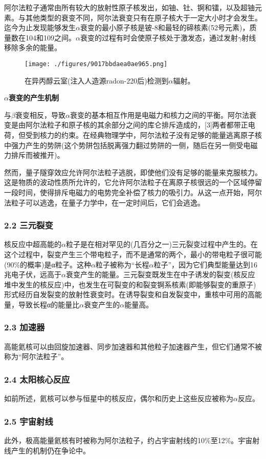 阿尔法粒子通常由所有较大的放射性原子核发出，如铀、钍、锕和镭，以及超铀元素。与其他类型的衰变不同，阿尔法衰变只有在原子核大于一定大小时才会发生。迄今为止发现能够发生$\alpha$衰变的最小原子核是铍-8和最轻的碲核素(52号元素)，质量数在104和109之间。$\alpha$衰变的过程有时会使原子核处于激发态，通过发射$\gamma$射线移除多余的能量。
\begin{figure}[ht]
\centering
\texttt{[image: ./figures/9017bbdaea0ae965.png]}
\caption{在异丙醇云室(注入人造源radon-220后)检测到$\alpha$辐射。} \label{fig_ALZ_2}
\end{figure}

\textbf{$\alpha$衰变的产生机制}

与$\beta$衰变相反，导致$\alpha$衰变的基本相互作用是电磁力和核力之间的平衡。阿尔法衰变是由阿尔法粒子和原子核的其余部分之间的库仑排斥造成的，[3]两者都带正电荷，但受到核力的约束。在经典物理学中，阿尔法粒子没有足够的能量逃离原子核中强力产生的势阱(这个势阱包括脱离强力翻过势阱的一侧，随后在另一侧受电磁力排斥而被推开)。

然而，量子隧穿效应允许阿尔法粒子逃脱，即使他们没有足够的能量来克服核力。这是物质的波动性质所允许的，它允许阿尔法粒子在离原子核很远的一个区域停留一段时间，使得排斥电磁力的电势完全补偿了核力的吸引力。从这一点开始，阿尔法粒子可以逃逸，在量子力学中，在一定时间后，它们会逃逸。
\subsubsection{2.2 三元裂变}
核反应中超高能的$\alpha$粒子是在相对罕见的(几百分之一)三元裂变过程中产生的。在这个过程中，裂变产生三个带电粒子，而不是通常的两个，最小的带电粒子很可能(90\%的概率)是α粒子。这种$\alpha$粒子被称为“长程$\alpha$粒子”，因为它们典型能量达到16兆电子伏，远高于$\alpha$衰变产生的能量。三元裂变既发生在中子诱发的裂变(核反应堆中发生的核反应)中，也发生在可裂变的和裂变锕系核素(即能够裂变的重原子)形式经历自发裂变的放射性衰变时。在诱导裂变和自发裂变中，重核中可用的高能量，导致长程α的能量比$\alpha$衰变产生的$\alpha$能量高。
\subsubsection{2.3 加速器}
高能氦核可以由回旋加速器、同步加速器和其他粒子加速器产生，但它们通常不被称为“阿尔法粒子”。
\subsubsection{2.4 太阳核心反应}
如前所述，氦核可以参与恒星中的核反应，偶尔和历史上这些反应被称为$\alpha$反应。
\subsubsection{2.5 宇宙射线}
此外，极高能量氦核有时被称为阿尔法粒子，约占宇宙射线的10\%至12\%。宇宙射线产生的机制仍在争论中。

